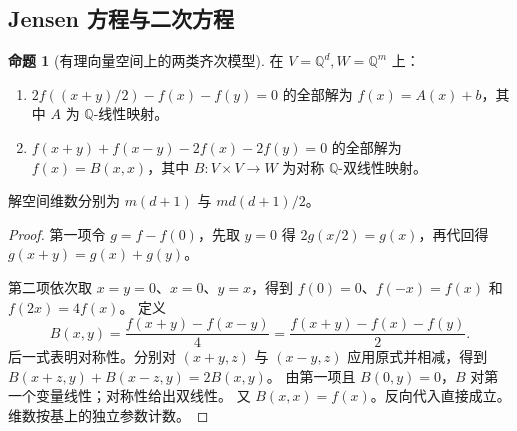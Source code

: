 \documentclass[UTF8,11pt,a4paper]{ctexart}
\theoremstyle{definition}
\newtheorem{proposition}[theorem]{命题}
\newcommand{\Q}{\mathbb Q}
\numberwithin{equation}{section}
\begin{document}
\subsection{Jensen 方程与二次方程}
\begin{proposition}[有理向量空间上的两类齐次模型]
在 $V=\Q^d,W=\Q^m$ 上：
\begin{enumerate}
\item $2f((x+y)/2)-f(x)-f(y)=0$ 的全部解为 $f(x)=A(x)+b$，其中 $A$ 为 $\Q$-线性映射。
\item $f(x+y)+f(x-y)-2f(x)-2f(y)=0$ 的全部解为 $f(x)=B(x,x)$，其中 $B:V\times V\to W$ 为对称 $\Q$-双线性映射。
\end{enumerate}
解空间维数分别为 $m(d+1)$ 与 $m d(d+1)/2$。
\end{proposition}
\begin{proof}
第一项令 $g=f-f(0)$，先取 $y=0$ 得 $2g(x/2)=g(x)$，再代回得 $g(x+y)=g(x)+g(y)$。

第二项依次取 $x=y=0$、$x=0$、$y=x$，得到 $f(0)=0$、$f(-x)=f(x)$ 和 $f(2x)=4f(x)$。
定义
\[
 B(x,y)=\frac{f(x+y)-f(x-y)}4
       =\frac{f(x+y)-f(x)-f(y)}2.
\]
后一式表明对称性。分别对 $(x+y,z)$ 与 $(x-y,z)$ 应用原式并相减，得到
$B(x+z,y)+B(x-z,y)=2B(x,y)$。
由第一项且 $B(0,y)=0$，$B$ 对第一个变量线性；对称性给出双线性。
又 $B(x,x)=f(x)$。反向代入直接成立。维数按基上的独立参数计数。
\end{proof}
\end{document}
